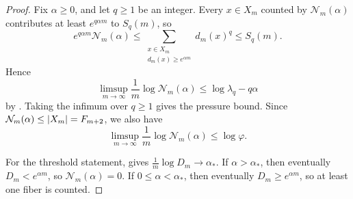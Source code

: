 \begin{proof}
Fix \(\alpha\ge 0\), and let \(q\ge 1\) be an integer.  Every
\(x\in X_m\) counted by \(\mathcal N_m(\alpha)\) contributes at least
\(e^{q\alpha m}\) to \(S_q(m)\), so
\[
  e^{q\alpha m}\mathcal N_m(\alpha)
  \le
  \sum_{\substack{x\in X_m\\ d_m(x)\ge e^{\alpha m}}} d_m(x)^q
  \le
  S_q(m).
\]
Hence
\[
  \limsup_{m\to\infty}\frac{1}{m}\log \mathcal N_m(\alpha)
  \le
  \log\lambda_q-q\alpha
\]
by .  Taking the infimum over \(q\ge 1\) gives the
pressure bound.  Since \(\mathcal N_m(\alpha)\le \lvert X_m \rvert=F_{m+2}\), we also
have
\[
  \limsup_{m\to\infty}\frac{1}{m}\log \mathcal N_m(\alpha)\le \log\varphi.
\]

For the threshold statement,  gives
\(
\frac{1}{m}\log D_m\to \alpha_\ast.
\)
If \(\alpha>\alpha_\ast\), then eventually \(D_m<e^{\alpha m}\), so
\(\mathcal N_m(\alpha)=0\).  If \(0\le \alpha<\alpha_\ast\), then eventually
\(D_m\ge e^{\alpha m}\), so at least one fiber is counted.
\end{proof}
